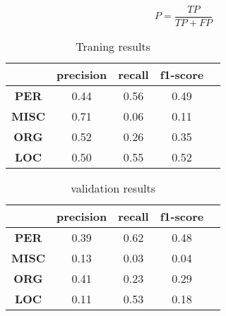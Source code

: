 \documentclass{IEEEtran}
\begin{document}
\begin{equation}
  \label{precision}
  P = \frac{TP}{TP + FP}
\end{equation}


\begin{table}[ht]
  \centering
  \begin{tabular}{|c|c|c|c|c|}
    \hline
    \textbf{}     & \textbf{precision} & \textbf{recall} & \textbf{f1-score} \\ \hline
    \textbf{PER}  & 0.44               & 0.56            & 0.49              \\
    \textbf{MISC} & 0.71               & 0.06            & 0.11              \\
    \textbf{ORG}  & 0.52               & 0.26            & 0.35              \\
    \textbf{LOC}  & 0.50               & 0.55            & 0.52              \\ \hline
  \end{tabular}
  \caption{Traning results}
  \label{tab:results}
\end{table}



\begin{table}[ht]
  \centering
  \begin{tabular}{|c|c|c|c|c|}
    \hline
    \textbf{}     & \textbf{precision} & \textbf{recall} & \textbf{f1-score} \\ \hline
    \textbf{PER}  & 0.39               & 0.62            & 0.48              \\
    \textbf{MISC} & 0.13               & 0.03            & 0.04              \\
    \textbf{ORG}  & 0.41               & 0.23            & 0.29              \\
    \textbf{LOC}  & 0.11               & 0.53            & 0.18              \\ \hline
  \end{tabular}
  \caption{validation results}
  \label{tab:results_validation}
\end{table}
\end{document}
